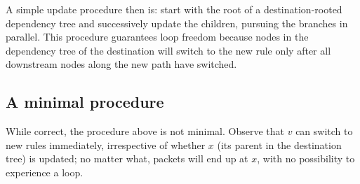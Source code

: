 A simple update procedure then is: start with the root of a destination-rooted dependency tree and successively update the children, pursuing the branches in parallel.
This procedure guarantees loop freedom because nodes in the dependency tree of the destination will switch to the new rule only after all downstream nodes along the new path have switched.









\subsection{A minimal procedure}
\label{sec:minimal}


While correct, the procedure above is not minimal. Observe that $v$ can switch to new rules immediately, irrespective of whether $x$ (its parent in the destination tree) is updated; no matter what, packets will end up at $x$, with no possibility to experience a loop.

